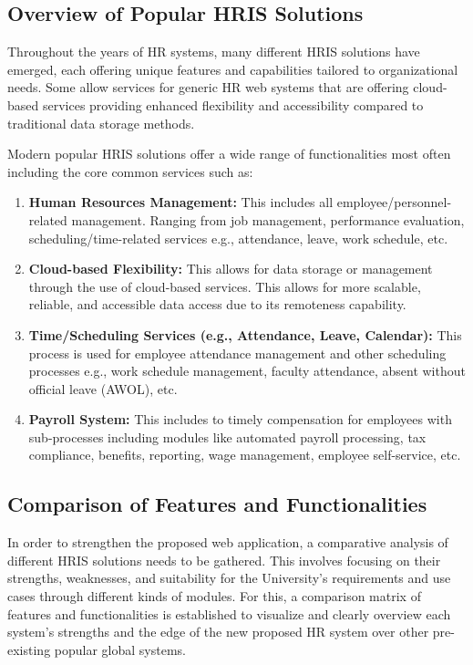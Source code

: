     \subsection{Overview of Popular HRIS Solutions}
    Throughout the years of HR systems, many different HRIS solutions have emerged, each offering unique features and capabilities tailored to organizational needs. Some allow services for generic HR web systems that are offering cloud-based services providing enhanced flexibility and accessibility compared to traditional data storage methods.

    Modern popular HRIS solutions offer a wide range of functionalities most often including the core common services such as:

    \begin{enumerate}
        \item \textbf{Human Resources Management:} This includes all employee/personnel-related management. Ranging from job management, performance evaluation, scheduling/time-related services e.g., attendance, leave, work schedule, etc.
        \item \textbf{Cloud-based Flexibility:} This allows for data storage or management through the use of cloud-based services. This allows for more scalable, reliable, and accessible data access due to its remoteness capability.
        \item \textbf{Time/Scheduling Services (e.g., Attendance, Leave, Calendar):} This process is used for employee attendance management and other scheduling processes e.g., work schedule management, faculty attendance, absent without official leave (AWOL), etc.
        \item \textbf{Payroll System:} This includes to timely compensation for employees with sub-processes including modules like automated payroll processing, tax compliance, benefits, reporting, wage management, employee self-service, etc.
    \end{enumerate}

    \subsection{Comparison of Features and Functionalities}
    In order to strengthen the proposed web application, a comparative analysis of different HRIS solutions needs to be gathered. This involves focusing on their strengths, weaknesses, and suitability for the University's requirements and use cases through different kinds of modules. For this, a comparison matrix of features and functionalities is established to visualize and clearly overview each system's strengths and the edge of the new proposed HR system over other pre-existing popular global systems.
    
